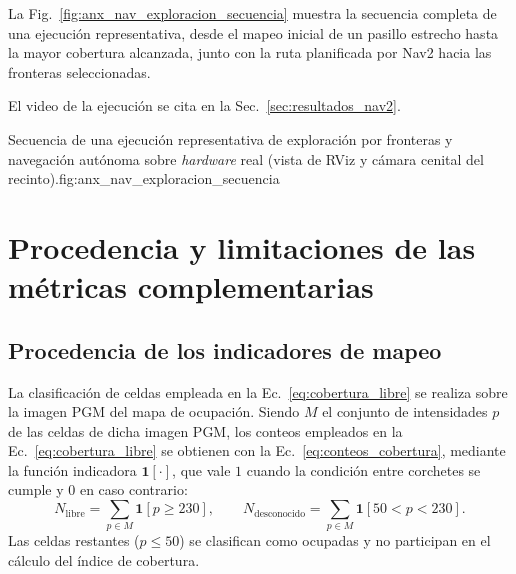 \begin{appendices}
La Fig.~\ref{fig:anx_nav_exploracion_secuencia} muestra la secuencia completa de una ejecución representativa, desde el mapeo inicial de un pasillo estrecho hasta la mayor cobertura alcanzada, junto con la ruta planificada por Nav2 hacia las fronteras seleccionadas.

El video de la ejecución se cita en la Sec.~\ref{sec:resultados_nav2}.

\begin{utemMultiFigurePropia}{Secuencia de una ejecución representativa de exploración por fronteras y navegación autónoma sobre \textit{hardware} real (vista de RViz y cámara cenital del recinto).}{fig:anx_nav_exploracion_secuencia}
\hfill
{}
\\[0.4cm]
\hfill
{}
\end{utemMultiFigurePropia}

\section{Procedencia y limitaciones de las métricas complementarias}
\label{anx:resultados_metodologia}

\subsection{Procedencia de los indicadores de mapeo}

La clasificación de celdas empleada en la
Ec.~\eqref{eq:cobertura_libre} se realiza sobre la imagen PGM del mapa de ocupación. Siendo $M$ el conjunto de intensidades $p$ de las celdas de dicha
imagen PGM, los conteos empleados en la Ec.~\eqref{eq:cobertura_libre} se
obtienen con la Ec.~\eqref{eq:conteos_cobertura}, mediante la función indicadora $\mathbf{1}[\cdot]$, que vale $1$ cuando
la condición entre corchetes se cumple y $0$ en caso contrario:
\begin{equation}
N_{\mathrm{libre}}=\sum_{p\in M}\mathbf{1}\!\left[p\geq230\right],
\qquad
N_{\mathrm{desconocido}}=\sum_{p\in M}\mathbf{1}\!\left[50<p<230\right].
\label{eq:conteos_cobertura}
\end{equation}
Las celdas restantes ($p\leq50$) se clasifican como ocupadas y no participan
en el cálculo del índice de cobertura.


\end{appendices}
